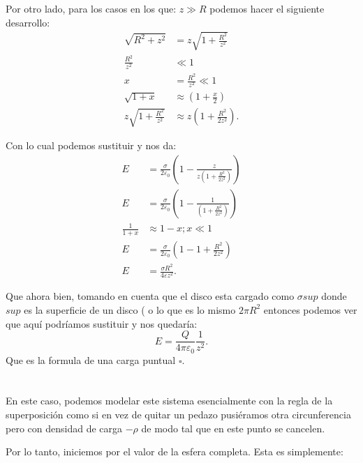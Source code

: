 \documentclass{report}
\begin{document}
Por otro lado, para los casos en los que: $z \gg R$ podemos hacer el siguiente desarrollo:
\begin{align*}
  \sqrt{R^2 + z^2} &= z\sqrt{1 + \frac{R^2}{z^2}}  \\
  \frac{R^2}{z^2} &\ll 1\\
  x &= \frac{R^2}{z^2} \ll 1 \\
  \sqrt{1 + x} &\approx \left( 1 + \frac{x}{2} \right) \\
  z\sqrt{1 + \frac{R^2}{z^2}} &\approx z\left( 1 + \frac{R^2}{2z^2} \right) 
.\end{align*}

Con lo cual podemos sustituir y nos da:
\begin{align*}
  E &= \frac{\sigma}{2\varepsilon_0} \left( 1 - \frac{z}{z\left( 1 + \frac{R^2}{2z^2} \right) } \right) \\
  E &= \frac{\sigma}{2\varepsilon_0} \left( 1 - \frac{1}{\left( 1 + \frac{R^2}{2z^2} \right) } \right) \\
  \frac{1}{1 + x} &\approx 1 - x; x \ll 1\\
  E &= \frac{\sigma}{2\varepsilon_0}\left( 1 - 1 + \frac{R^2}{2z^2} \right)  \\
  E &= \frac{\sigma R^2}{4\varepsilon z^2}
.\end{align*}

Que ahora bien, tomando en cuenta que el disco esta cargado como $\sigma sup$ donde  $sup$ es la superficie de un disco ( o lo que es lo mismo $2\pi R^2$ entonces podemos ver que aquí podríamos sustituir y nos quedaría: \[
E = \frac{Q}{4\pi\varepsilon_0} \frac{1}{z^2}
.\]  Que es la formula de una carga puntual $\square$.

\chapter{}

En este caso, podemos modelar este sistema esencialmente con la regla de la superposición como si en vez de quitar un pedazo pusiéramos otra circunferencia pero con densidad de carga $-\rho$ de modo tal que en este punto se cancelen.

Por lo tanto, iniciemos por el valor de la esfera completa. Esta es simplemente:
\end{document}
